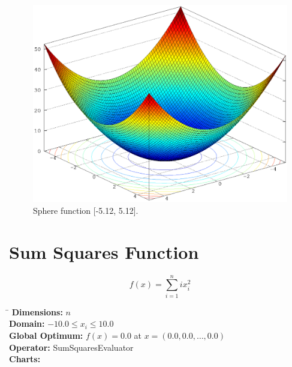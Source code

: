 \documentclass[12pt, a4paper]{article}
\begin{document}
		\begin{figure}[ht]
			\includegraphics[width=\textwidth]{Images/Sphere}
			\caption{Sphere function [-5.12, 5.12].}
		\end{figure}

	\newpage

	\section*{Sum Squares Function}
		\begin{equation*}
			f(x)=\sum\limits_{i=1}^n ix_i^2
		\end{equation*}

		\begin{tabbing}
			\hspace{5cm}\=\kill
			\textbf{Dimensions:}     \> $n$ \\
			\textbf{Domain:}         \> $-10.0 \leq x_i \leq 10.0$ \\
			\textbf{Global Optimum:} \> $f(x) = 0.0$ at $x = (0.0, 0.0, \dots, 0.0)$ \\
			\textbf{Operator:}       \> SumSquaresEvaluator \\
			\textbf{Charts:}         \> \\
		\end{tabbing}
\end{document}
